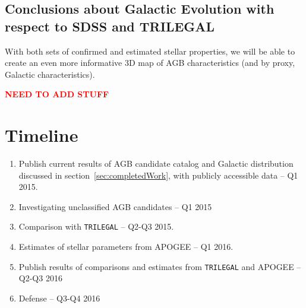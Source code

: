\subsection{Conclusions about Galactic Evolution with respect to SDSS and TRILEGAL}
With both sets of confirmed and estimated stellar properties, we will be able to create an even more informative 3D map of AGB characteristics (and by proxy, Galactic characteristics).

\begin{center}\textbf{\textcolor{red}{NEED TO ADD STUFF}}\end{center}

\section{Timeline}
\begin{enumerate}
\item Publish current results of AGB candidate catalog and Galactic distribution discussed in section~\ref{sec:completedWork}, with publicly accessible data -- Q1 2015.
\item Investigating unclassified AGB candidates -- Q1 2015
\item Comparison with {\tt TRILEGAL} -- Q2-Q3 2015.
\item Estimates of stellar parameters from APOGEE -- Q1 2016.
\item Publish results of comparisons and estimates from {\tt TRILEGAL} and APOGEE -- Q2-Q3 2016
\item Defense -- Q3-Q4 2016
\end{enumerate}

